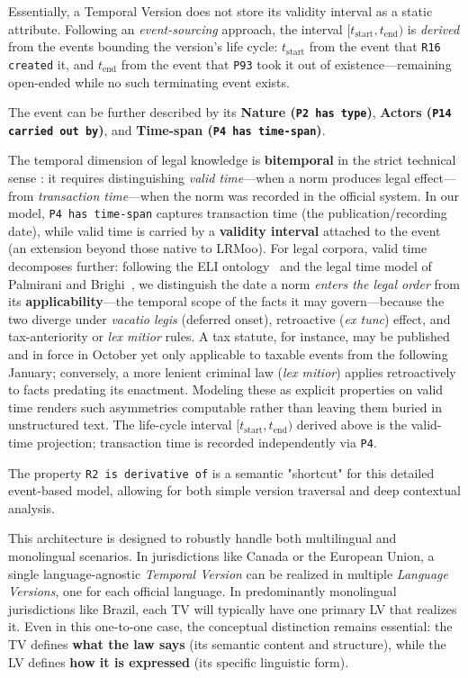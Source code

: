 \documentclass[11pt]{article}
\begin{document}
Essentially, a Temporal Version does not store its validity interval as a static attribute. Following an \emph{event-sourcing} approach, the interval $[t_{\text{start}}, t_{\text{end}})$ is \emph{derived} from the events bounding the version's life cycle: $t_{\text{start}}$ from the event that \texttt{R16 created} it, and $t_{\text{end}}$ from the event that \texttt{P93} took it out of existence---remaining open-ended while no such terminating event exists.

The event can be further described by its \textbf{Nature (\texttt{P2 has type})}, 
\textbf{Actors (\texttt{P14 carried out by})}, and 
\textbf{Time-span (\texttt{P4 has time-span})}.

The temporal dimension of legal knowledge is \textbf{bitemporal} in the strict technical sense \cite{snodgrass1999developing}: it requires distinguishing \emph{valid time}---when a norm produces legal effect---from \emph{transaction time}---when the norm was recorded in the official system. In our model, \texttt{P4 has time-span} captures transaction time (the publication/recording date), while valid time is carried by a \textbf{validity interval} attached to the event (an extension beyond those native to LRMoo). For legal corpora, valid time decomposes further: following the ELI ontology~\cite{eli2014standard} and the legal time model of Palmirani and Brighi~\cite{palmirani2006time}, we distinguish the date a norm \emph{enters the legal order} from its \textbf{applicability}---the temporal scope of the facts it may govern---because the two diverge under \emph{vacatio legis} (deferred onset), retroactive (\emph{ex tunc}) effect, and tax-anteriority or \emph{lex mitior} rules. A tax statute, for instance, may be published and in force in October yet only applicable to taxable events from the following January; conversely, a more lenient criminal law (\emph{lex mitior}) applies retroactively to facts predating its enactment. Modeling these as explicit properties on valid time renders such asymmetries computable rather than leaving them buried in unstructured text. The life-cycle interval $[t_{\text{start}}, t_{\text{end}})$ derived above is the valid-time projection; transaction time is recorded independently via \texttt{P4}.

The property \texttt{R2 is derivative of} is a semantic "shortcut" for this detailed event-based model, allowing for both simple version traversal and deep contextual analysis.

This architecture is designed to robustly handle both multilingual and 
monolingual scenarios. In jurisdictions like Canada or the European Union, 
a single language-agnostic \emph{Temporal Version} can be realized in 
multiple \emph{Language Versions}, one for each official language. In 
predominantly monolingual jurisdictions like Brazil, each TV will typically 
have one primary LV that realizes it. Even in this one-to-one case, 
the conceptual distinction remains essential: the TV defines \textbf{what the 
law says} (its semantic content and structure), while the LV defines 
\textbf{how it is expressed} (its specific linguistic form).
\end{document}
